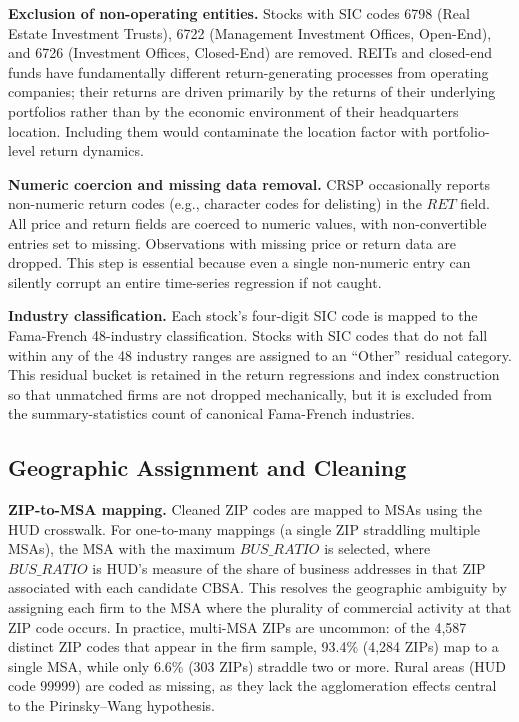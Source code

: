 \documentclass[
  12pt,
]{article}
\begin{document}
\textbf{Exclusion of non-operating entities.} Stocks with SIC codes 6798
(Real Estate Investment Trusts), 6722 (Management Investment Offices,
Open-End), and 6726 (Investment Offices, Closed-End) are removed. REITs
and closed-end funds have fundamentally different return-generating
processes from operating companies; their returns are driven primarily
by the returns of their underlying portfolios rather than by the
economic environment of their headquarters location. Including them
would contaminate the location factor with portfolio-level return
dynamics.

\textbf{Numeric coercion and missing data removal.} CRSP occasionally
reports non-numeric return codes (e.g., character codes for delisting)
in the \(RET\) field. All price and return fields are coerced to numeric
values, with non-convertible entries set to missing. Observations with
missing price or return data are dropped. This step is essential because
even a single non-numeric entry can silently corrupt an entire
time-series regression if not caught.

\textbf{Industry classification.} Each stock's four-digit SIC code is
mapped to the Fama-French 48-industry classification. Stocks with SIC
codes that do not fall within any of the 48 industry ranges are assigned
to an ``Other'' residual category. This residual bucket is retained in
the return regressions and index construction so that unmatched firms
are not dropped mechanically, but it is excluded from the
summary-statistics count of canonical Fama-French industries.

\subsection{Geographic Assignment and
Cleaning}\label{geographic-assignment-and-cleaning}

\textbf{ZIP-to-MSA mapping.} Cleaned ZIP codes are mapped to MSAs using
the HUD crosswalk. For one-to-many mappings (a single ZIP straddling
multiple MSAs), the MSA with the maximum \(BUS\_RATIO\) is selected,
where \(BUS\_RATIO\) is HUD's measure of the share of business addresses
in that ZIP associated with each candidate CBSA. This resolves the
geographic ambiguity by assigning each firm to the MSA where the
plurality of commercial activity at that ZIP code occurs. In practice,
multi-MSA ZIPs are uncommon: of the 4,587 distinct ZIP codes that appear
in the firm sample, 93.4\% (4,284 ZIPs) map to a single MSA, while only
6.6\% (303 ZIPs) straddle two or more. Rural areas (HUD code 99999) are
coded as missing, as they lack the agglomeration effects central to the
Pirinsky--Wang hypothesis.
\end{document}

